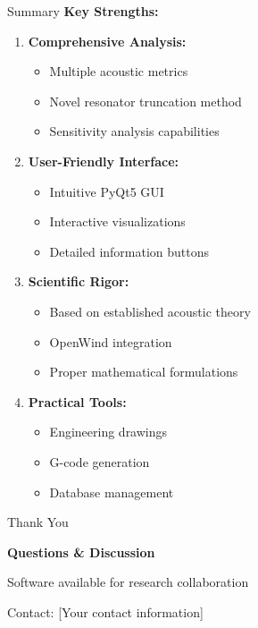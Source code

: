 \documentclass[aspectratio=169,10pt]{beamer}
\begin{document}
\begin{frame}{Summary}
\textbf{Key Strengths:}

\begin{enumerate}
    \item \textbf{Comprehensive Analysis:}
    \begin{itemize}
        \item Multiple acoustic metrics
        \item Novel resonator truncation method
        \item Sensitivity analysis capabilities
    \end{itemize}
    
    \item \textbf{User-Friendly Interface:}
    \begin{itemize}
        \item Intuitive PyQt5 GUI
        \item Interactive visualizations
        \item Detailed information buttons
    \end{itemize}
    
    \item \textbf{Scientific Rigor:}
    \begin{itemize}
        \item Based on established acoustic theory
        \item OpenWind integration
        \item Proper mathematical formulations
    \end{itemize}
    
    \item \textbf{Practical Tools:}
    \begin{itemize}
        \item Engineering drawings
        \item G-code generation
        \item Database management
    \end{itemize}
\end{enumerate}
\end{frame}

\begin{frame}{Thank You}
\begin{center}
\Large
\textbf{Questions \& Discussion}

\vspace{1cm}

\large
Software available for research collaboration

\vspace{0.5cm}

\normalsize
Contact: [Your contact information]
\end{center}
\end{frame}
\end{document}
